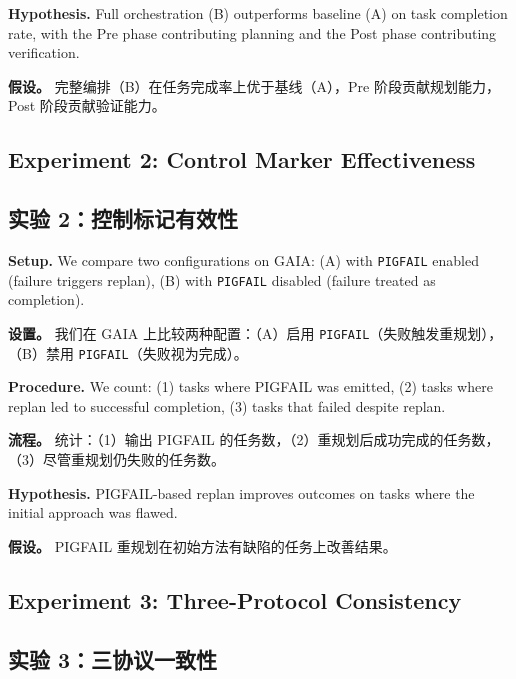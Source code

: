 \textbf{Hypothesis.} Full orchestration (B) outperforms baseline (A) on task completion rate, with the Pre phase contributing planning and the Post phase contributing verification.
\begin{chinese}
\textbf{假设。} 完整编排（B）在任务完成率上优于基线（A），Pre 阶段贡献规划能力，Post 阶段贡献验证能力。
\end{chinese}

\subsection{Experiment 2: Control Marker Effectiveness}
\begin{chinese}
\subsection*{实验 2：控制标记有效性}
\end{chinese}

\textbf{Setup.} We compare two configurations on GAIA: (A) with \texttt{PIGFAIL} enabled (failure triggers replan), (B) with \texttt{PIGFAIL} disabled (failure treated as completion).
\begin{chinese}
\textbf{设置。} 我们在 GAIA 上比较两种配置：（A）启用 \texttt{PIGFAIL}（失败触发重规划），（B）禁用 \texttt{PIGFAIL}（失败视为完成）。
\end{chinese}

\textbf{Procedure.} We count: (1) tasks where PIGFAIL was emitted, (2) tasks where replan led to successful completion, (3) tasks that failed despite replan.
\begin{chinese}
\textbf{流程。} 统计：（1）输出 PIGFAIL 的任务数，（2）重规划后成功完成的任务数，（3）尽管重规划仍失败的任务数。
\end{chinese}

\textbf{Hypothesis.} PIGFAIL-based replan improves outcomes on tasks where the initial approach was flawed.
\begin{chinese}
\textbf{假设。} PIGFAIL 重规划在初始方法有缺陷的任务上改善结果。
\end{chinese}

\subsection{Experiment 3: Three-Protocol Consistency}
\begin{chinese}
\subsection*{实验 3：三协议一致性}
\end{chinese}

